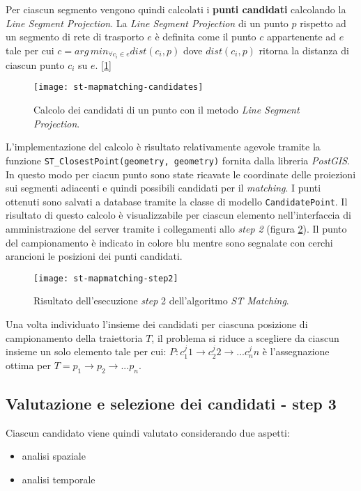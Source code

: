 Per ciascun segmento vengono quindi calcolati i \textbf{punti candidati} calcolando la \emph{Line Segment Projection}. La \emph{Line Segment Projection} di un punto $p$ rispetto ad un segmento di rete di trasporto $e$ è definita come il punto $c$ appartenente ad $e$ tale per cui $c=arg\, min_{\forall c_i \in e} dist(c_i, p)$ dove $dist(c_i, p)$ ritorna la distanza di ciascun punto $c_i$ su $e$. [\ref{fig:st-mapmatching-candidates}]

\begin{figure}[h]
  \centering
  \texttt{[image: st-mapmatching-candidates]}
  \caption{\footnotesize{Calcolo dei candidati di un punto con il metodo \emph{Line Segment Projection}.}}
  \label{fig:st-mapmatching-candidates}
\end{figure}

L'implementazione del calcolo è risultato relativamente agevole tramite la funzione \texttt{ST\_ClosestPoint(geometry, geometry)} fornita dalla libreria \emph{PostGIS}. In questo modo per ciacun punto sono state ricavate le coordinate delle proiezioni sui segmenti adiacenti e quindi possibili candidati per il \emph{matching}. I punti ottenuti sono salvati a database tramite la classe di modello \texttt{CandidatePoint}. Il risultato di questo calcolo è visualizzabile per ciascun elemento nell'interfaccia di amministrazione del server tramite i collegamenti allo \emph{step 2} (figura \ref{fig:st-mapmatching-step2}). Il punto del campionamento è indicato in colore blu mentre sono segnalate con cerchi arancioni le posizioni dei punti candidati.

\begin{figure}[h]
  \centering
  \texttt{[image: st-mapmatching-step2]}
  \caption{\footnotesize{Risultato dell'esecuzione \emph{step} 2 dell'algoritmo \emph{ST Matching}.}}
  \label{fig:st-mapmatching-step2}
\end{figure}

Una volta individuato l'insieme dei candidati per ciascuna posizione di campionamento della traiettoria $T$, il problema si riduce a scegliere da ciascun insieme un solo elemento tale per cui: $P: c_1^j1 \rightarrow c_2^j2 \rightarrow ... c_n^jn$ è l'assegnazione ottima per $T=p_1 \rightarrow p_2 \rightarrow ... p_n$.

\subsection{Valutazione e selezione dei candidati - step 3}
Ciascun candidato viene quindi valutato considerando due aspetti:
\begin{itemize}
  \item analisi spaziale
  \item analisi temporale
\end{itemize}

